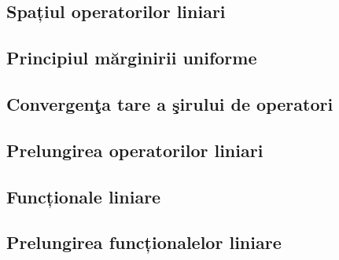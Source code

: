 \documentclass[a4paper,12pt]{article}
\theoremstyle{change}
\begin{document}

\subsection{Spațiul operatorilor liniari}

\subsection{Principiul mărginirii uniforme}


\subsection{Convergenţa tare a şirului de operatori}

\subsection{Prelungirea operatorilor liniari}


\subsection{Funcționale liniare}


\subsection{Prelungirea funcționalelor liniare}
\end{document}
